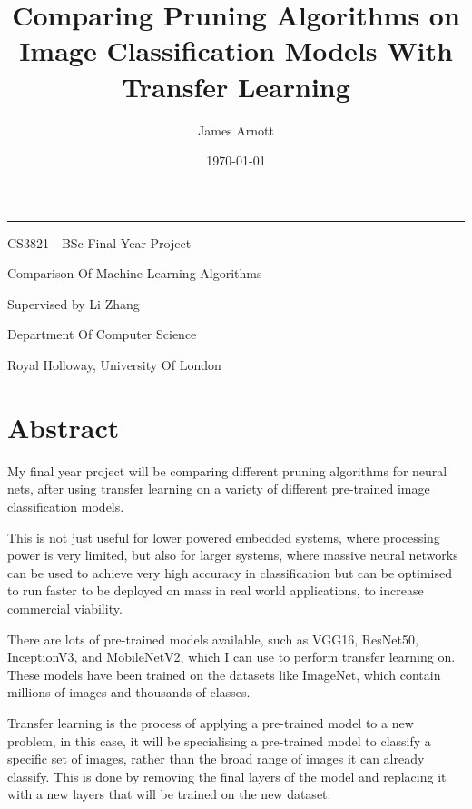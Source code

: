 \documentclass{article}
\title{\titleFont Comparing Pruning Algorithms on Image Classification Models With Transfer Learning}
\date{\Large \today}
\author{\subtitleFont James Arnott}
\begin{document}
\maketitle

\begin {center}
\noindent\rule{15cm}{0.4pt}
\end{center}

\vspace{1cm}

\begin{center}
	\begin{Large}
			CS3821 - BSc Final Year Project
			
			Comparison Of Machine Learning Algorithms

			Supervised by Li Zhang

			\vspace{0.6cm}

			Department Of Computer Science

			\vspace{0.2cm}

			Royal Holloway, University Of London
	\end{Large}
\end{center}


\pagebreak

\section{Abstract}
My final year project will be comparing different pruning algorithms for neural nets,
after using transfer learning on a variety of different pre-trained image classification models.

This is not just useful for lower powered embedded systems\cite{EmbeddedSystems},
where processing power is very limited, but also for larger systems,
where massive neural networks can be used to achieve very
high accuracy in classification but can be optimised to run faster
to be deployed on mass in real world applications, to increase
commercial viability.

There are lots of pre-trained models available, such as VGG16, ResNet50, InceptionV3,
and MobileNetV2, which I can use to perform transfer learning on. These models
have been trained on the datasets like ImageNet\cite{ImageNet}, which contain millions of images
and thousands of classes.

Transfer learning is the process of applying a pre-trained model to a new problem,
in this case, it will be specialising a pre-trained model to classify a specific set of images, 
rather than the broad range of images it can already classify.
This is done by removing the final layers of the model and replacing it with a new layers
that will be trained on the new dataset.
\end{document}
